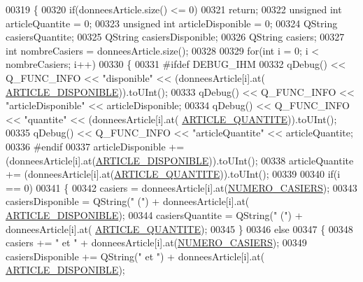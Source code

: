 \begin{DoxyCode}
00319 \{
00320     \textcolor{keywordflow}{if}(donneesArticle.size() <= 0)
00321         \textcolor{keywordflow}{return};
00322     \textcolor{keywordtype}{unsigned} \textcolor{keywordtype}{int} articleQuantite = 0;
00323     \textcolor{keywordtype}{unsigned} \textcolor{keywordtype}{int} articleDisponible = 0;
00324     QString casiersQuantite;
00325     QString casiersDisponible;
00326     QString casiers;
00327     \textcolor{keywordtype}{int} nombreCasiers = donneesArticle.size();
00328 
00329     \textcolor{keywordflow}{for}(\textcolor{keywordtype}{int} i = 0; i < nombreCasiers; i++)
00330     \{
00331 \textcolor{preprocessor}{        #ifdef DEBUG\_IHM}
00332             qDebug() << Q\_FUNC\_INFO << \textcolor{stringliteral}{"disponible"} << (donneesArticle[i].at(
      \hyperlink{_ihm_8h_a2c5f129a41ff7dac8fa0d97af2d1efd5}{ARTICLE\_DISPONIBLE})).toUInt();
00333             qDebug() << Q\_FUNC\_INFO << \textcolor{stringliteral}{"articleDisponible"} << articleDisponible;
00334             qDebug() << Q\_FUNC\_INFO << \textcolor{stringliteral}{"quantite"} << (donneesArticle[i].at(
      \hyperlink{_ihm_8h_ac91f014239536b9bb49d4265ca91d0d5}{ARTICLE\_QUANTITE})).toUInt();
00335             qDebug() << Q\_FUNC\_INFO << \textcolor{stringliteral}{"articleQuantite"} << articleQuantite;
00336 \textcolor{preprocessor}{        #endif}
00337         articleDisponible += (donneesArticle[i].at(\hyperlink{_ihm_8h_a2c5f129a41ff7dac8fa0d97af2d1efd5}{ARTICLE\_DISPONIBLE})).toUInt();
00338         articleQuantite += (donneesArticle[i].at(\hyperlink{_ihm_8h_ac91f014239536b9bb49d4265ca91d0d5}{ARTICLE\_QUANTITE})).toUInt();
00339 
00340         \textcolor{keywordflow}{if}(i == 0)
00341         \{
00342             casiers = donneesArticle[i].at(\hyperlink{_ihm_8h_a7935787ef2fa7206f347feff73167ce6}{NUMERO\_CASIERS});
00343             casiersDisponible = QString(\textcolor{stringliteral}{" ("}) + donneesArticle[i].at(
      \hyperlink{_ihm_8h_a2c5f129a41ff7dac8fa0d97af2d1efd5}{ARTICLE\_DISPONIBLE});
00344             casiersQuantite = QString(\textcolor{stringliteral}{" ("}) + donneesArticle[i].at(
      \hyperlink{_ihm_8h_ac91f014239536b9bb49d4265ca91d0d5}{ARTICLE\_QUANTITE});
00345         \}
00346         \textcolor{keywordflow}{else}
00347         \{
00348             casiers += \textcolor{stringliteral}{" et "} + donneesArticle[i].at(\hyperlink{_ihm_8h_a7935787ef2fa7206f347feff73167ce6}{NUMERO\_CASIERS});
00349             casiersDisponible += QString(\textcolor{stringliteral}{" et "}) + donneesArticle[i].at(
      \hyperlink{_ihm_8h_a2c5f129a41ff7dac8fa0d97af2d1efd5}{ARTICLE\_DISPONIBLE});

\end{DoxyCode}
